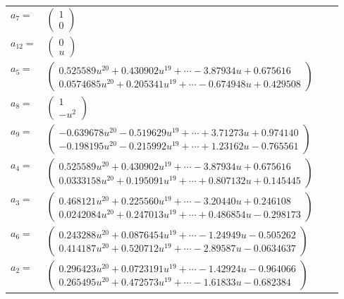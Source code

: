 \documentclass[1p]{elsarticle_modified}
\theoremstyle{definition}
\begin{document}
\begin{tabular}{m{7pt} m{180pt} m{7pt} m{180pt} }
\flushright $a_{7}=$&$\begin{pmatrix}1\\0\end{pmatrix}$ \\
\flushright $a_{12}=$&$\begin{pmatrix}0\\u\end{pmatrix}$ \\
\flushright $a_{5}=$&$\begin{pmatrix}0.525589 u^{20}+0.430902 u^{19}+\cdots-3.87934 u+0.675616\\0.0574685 u^{20}+0.205341 u^{19}+\cdots-0.674948 u+0.429508\end{pmatrix}$ \\
\flushright $a_{8}=$&$\begin{pmatrix}1\\- u^2\end{pmatrix}$ \\
\flushright $a_{9}=$&$\begin{pmatrix}-0.639678 u^{20}-0.519629 u^{19}+\cdots+3.71273 u+0.974140\\-0.198195 u^{20}-0.215992 u^{19}+\cdots+1.23162 u-0.765561\end{pmatrix}$ \\
\flushright $a_{4}=$&$\begin{pmatrix}0.525589 u^{20}+0.430902 u^{19}+\cdots-3.87934 u+0.675616\\0.0333158 u^{20}+0.195091 u^{19}+\cdots+0.807132 u+0.145445\end{pmatrix}$ \\
\flushright $a_{3}=$&$\begin{pmatrix}0.468121 u^{20}+0.225560 u^{19}+\cdots-3.20440 u+0.246108\\0.0242084 u^{20}+0.247013 u^{19}+\cdots+0.486854 u-0.298173\end{pmatrix}$ \\
\flushright $a_{6}=$&$\begin{pmatrix}0.243288 u^{20}+0.0876454 u^{19}+\cdots-1.24949 u-0.505262\\0.414187 u^{20}+0.520712 u^{19}+\cdots-2.89587 u-0.0634637\end{pmatrix}$ \\
\flushright $a_{2}=$&$\begin{pmatrix}0.296423 u^{20}+0.0723191 u^{19}+\cdots-1.42924 u-0.964066\\0.265495 u^{20}+0.472573 u^{19}+\cdots-1.61833 u-0.682384\end{pmatrix}$ \\

\end{tabular}
\end{document}
